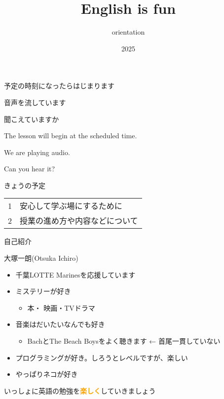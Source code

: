 \documentclass[
  ignorenonframetext,
  aspectratio=169,
  xcolor=dvipsnames]{beamer}
\title{English is fun}
\subtitle{orientation}
\author{}
\date{\vspace{-2.5em}2025}
\providecommand{\tightlist}{%
  \setlength{\itemsep}{0pt}\setlength{\parskip}{0pt}}
\begin{document}
\frame{\titlepage}

\begin{frame}{}
\label{section}
\thispagestyle{empty}
\Large

\raggedright

予定の時刻になったらはじまります

\textbullet  音声を流しています

\textbullet  聞こえていますか　

\vfill

\raggedleft

The lesson will begin at the scheduled time.

\vspace{-6pt}

We are playing audio.

\vspace{-6pt}

Can you hear it?
\end{frame}

\begin{frame}{}
\label{section-1}
\thispagestyle{empty}
\titlepage
\end{frame}

\begin{frame}{きょうの予定}
\label{ux304dux3087ux3046ux306eux4e88ux5b9a}
\thispagestyle{empty}
\LARGE

\begin{tabular}{rl}
1&安心して学ぶ場にするために\\
2&授業の進め方や内容などについて
\end{tabular}
\end{frame}

\begin{frame}{自己紹介}
\label{ux81eaux5df1ux7d39ux4ecb}
\thispagestyle{empty}
\Large

\pause

大塚一朗(Otsuka Ichiro)

\pause

\begin{itemize}[<+->]
\tightlist
\item
  千葉LOTTE Marinesを応援しています
\item
  ミステリーが好き

  \begin{itemize}[<+->]
  \tightlist
  \item
    本・ 映画・TVドラマ
  \end{itemize}
\item
  音楽はだいたいなんでも好き

  \begin{itemize}[<+->]
  \tightlist
  \item
    BachとThe Beach Boysをよく聴きます ← 首尾一貫していない
  \end{itemize}
\item
  プログラミングが好き。しろうとレベルですが、楽しい
\item
  やっぱりネコが好き \pause
\end{itemize}

いっしょに英語の勉強を\textcolor{Orange}{\bfseries 楽しく}していきましょう
\end{frame}
\end{document}
